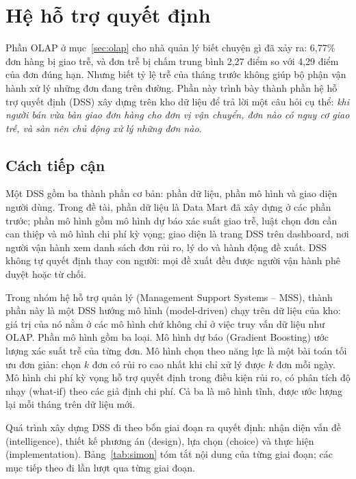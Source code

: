 \section{Hệ hỗ trợ quyết định}\label{sec:dss}

Phần OLAP ở mục~\ref{sec:olap} cho nhà quản lý biết chuyện gì đã xảy ra: 6,77\% đơn hàng bị giao trễ, và đơn trễ bị chấm trung bình 2,27 điểm so với 4,29 điểm của đơn đúng hạn. Nhưng biết tỷ lệ trễ của tháng trước không giúp bộ phận vận hành xử lý những đơn đang trên đường. Phần này trình bày thành phần hệ hỗ trợ quyết định (DSS) xây dựng trên kho dữ liệu để trả lời một câu hỏi cụ thể: \textit{khi người bán vừa bàn giao đơn hàng cho đơn vị vận chuyển, đơn nào có nguy cơ giao trễ, và sàn nên chủ động xử lý những đơn nào}.

\subsection{Cách tiếp cận}

Một DSS gồm ba thành phần cơ bản: phần dữ liệu, phần mô hình và giao diện người dùng. Trong đề tài, phần dữ liệu là Data Mart đã xây dựng ở các phần trước; phần mô hình gồm mô hình dự báo xác suất giao trễ, luật chọn đơn cần can thiệp và mô hình chi phí kỳ vọng; giao diện là trang DSS trên dashboard, nơi người vận hành xem danh sách đơn rủi ro, lý do và hành động đề xuất. DSS không tự quyết định thay con người: mọi đề xuất đều được người vận hành phê duyệt hoặc từ chối.

Trong nhóm hệ hỗ trợ quản lý (Management Support Systems -- MSS), thành phần này là một DSS hướng mô hình (model-driven) chạy trên dữ liệu của kho: giá trị của nó nằm ở các mô hình chứ không chỉ ở việc truy vấn dữ liệu như OLAP. Phần mô hình gồm ba loại. Mô hình dự báo (Gradient Boosting) ước lượng xác suất trễ của từng đơn. Mô hình chọn theo năng lực là một bài toán tối ưu đơn giản: chọn $k$ đơn có rủi ro cao nhất khi chỉ xử lý được $k$ đơn mỗi ngày. Mô hình chi phí kỳ vọng hỗ trợ quyết định trong điều kiện rủi ro, có phân tích độ nhạy (what-if) theo các giả định chi phí. Cả ba là mô hình tĩnh, được ước lượng lại mỗi tháng trên dữ liệu mới.

Quá trình xây dựng DSS đi theo bốn giai đoạn ra quyết định: nhận diện vấn đề (intelligence), thiết kế phương án (design), lựa chọn (choice) và thực hiện (implementation). Bảng~\ref{tab:simon} tóm tắt nội dung của từng giai đoạn; các mục tiếp theo đi lần lượt qua từng giai đoạn.

